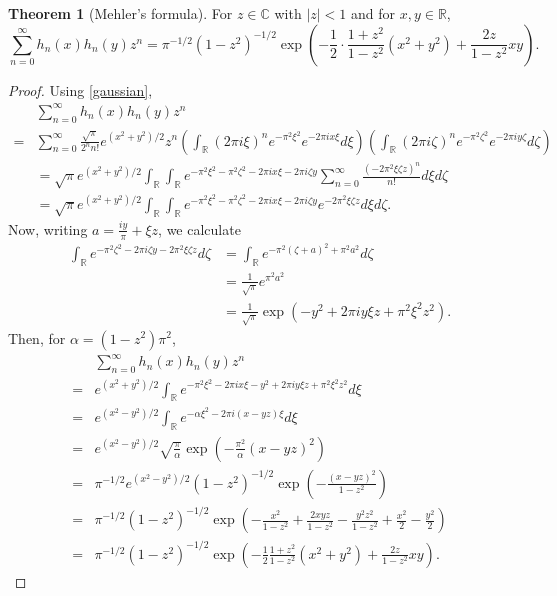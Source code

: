 \documentclass{article}
\theoremstyle{definition}
\newtheorem{theorem}{Theorem}
\theoremstyle{definition}
\begin{document}
\begin{theorem}[Mehler's formula]
For $z \in \mathbb{C}$ with $|z|<1$ and for $x,y \in \mathbb{R}$,
\[
\sum_{n=0}^\infty h_n(x) h_n(y) z^n = \pi^{-1/2} (1-z^2)^{-1/2} \exp\left(-\frac{1}{2} \cdot \frac{1+z^2}{1-z^2}(x^2+y^2) + \frac{2z}{1-z^2} xy\right).
\]
\end{theorem}
\begin{proof}
Using \eqref{gaussian},
\[
\begin{split}
&\sum_{n=0}^\infty h_n(x) h_n(y) z^n\\
=&\sum_{n=0}^\infty 
\frac{\sqrt{\pi}}{2^n n!} e^{(x^2+y^2)/2} z^n \left(\int_{\mathbb{R}} (2\pi i\xi)^n e^{-\pi^2 \xi^2} e^{-2\pi ix\xi} d\xi\right)
\left(\int_{\mathbb{R}} (2\pi i\zeta)^n e^{-\pi^2 \zeta^2} e^{-2\pi iy\zeta} d\zeta\right)\\
&=\sqrt{\pi} e^{(x^2+y^2)/2} \int_{\mathbb{R}} \int_{\mathbb{R}} e^{-\pi^2\xi^2-\pi^2\zeta^2-2\pi ix\xi - 2\pi i\zeta y}
\sum_{n=0}^\infty \frac{(-2\pi^2 \xi \zeta z)^n}{n!} d\xi d\zeta\\
&=\sqrt{\pi} e^{(x^2+y^2)/2}  \int_{\mathbb{R}} \int_{\mathbb{R}}  e^{-\pi^2\xi^2-\pi^2\zeta^2-2\pi ix\xi - 2\pi i\zeta y}
e^{-2\pi^2 \xi \zeta z} d\xi d\zeta.
\end{split}
\]
Now, writing $a=\frac{iy}{\pi}+\xi z$, we calculate
\begin{align*}
\int_{\mathbb{R}} e^{-\pi^2 \zeta^2 - 2\pi i\zeta y-2\pi^2 \xi \zeta z} d\zeta& = \int_{\mathbb{R}}
e^{-\pi^2(\zeta+a)^2+\pi^2 a^2} d\zeta\\
&=\frac{1}{\sqrt{\pi}} e^{\pi^2 a^2}\\
& = \frac{1}{\sqrt{\pi}} \exp\left(-y^2+2\pi iy\xi z +\pi^2 \xi^2 z^2\right).
\end{align*}
Then, for $\alpha=(1-z^2)\pi^2$,
\[
\begin{split}
&\sum_{n=0}^\infty h_n(x) h_n(y) z^n\\
=&e^{(x^2+y^2)/2} \int_{\mathbb{R}} e^{-\pi^2 \xi^2-2\pi ix\xi-y^2+2\pi i y\xi z + \pi^2 \xi^2 z^2} d\xi\\
=&e^{(x^2-y^2)/2} \int_{\mathbb{R}}  e^{-\alpha \xi^2-2\pi i(x-yz) \xi} d\xi\\
=&e^{(x^2-y^2)/2} \sqrt{\frac{\pi}{\alpha}} \exp\left(-\frac{\pi^2}{\alpha} (x-yz)^2\right)\\
=&\pi^{-1/2} e^{(x^2-y^2)/2} (1-z^2)^{-1/2} \exp\left(-\frac{(x-yz)^2}{1-z^2}\right)\\
=&\pi^{-1/2} (1-z^2)^{-1/2} \exp\left(-\frac{x^2}{1-z^2}+\frac{2xyz}{1-z^2}-\frac{y^2z^2}{1-z^2}+\frac{x^2}{2}-\frac{y^2}{2}\right)\\
=&\pi^{-1/2} (1-z^2)^{-1/2} \exp\left(-\frac{1}{2} \frac{1+z^2}{1-z^2}(x^2+y^2) + \frac{2z}{1-z^2} xy\right).
\end{split}
\]
\end{proof}
\end{document}
